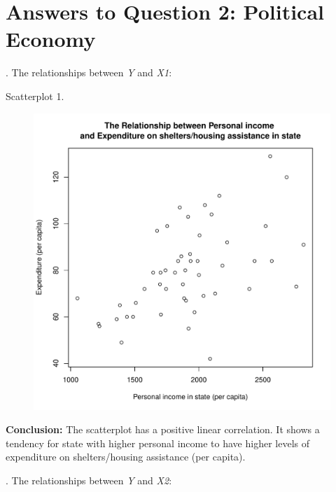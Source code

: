\documentclass[12pt,letterpaper]{article}
\begin{document}
\newpage
\section*{Answers to Question 2: Political Economy}

. The relationships between \emph{Y} and \emph{X1}:
  

\noindent Scatterplot 1.

\begin{figure}[h!]\centering
	\caption{\footnotesize }
	\label{fig:plot_1}
	\includegraphics[width=.75\textwidth]{plot1_1.pdf}
\end{figure}

\noindent \textbf{Conclusion:} The scatterplot has a positive linear correlation. It shows a tendency for state with higher personal income to have higher levels of expenditure on shelters/housing assistance (per capita). 
\vspace{.5cm}

\newpage
{}. The relationships between \emph{Y} and \emph{X2}:
  
\end{document}
